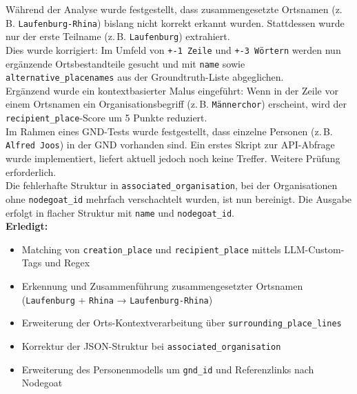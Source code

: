 \documentclass{article}
\begin{document}
\vspace{0.5em}
\noindent Während der Analyse wurde festgestellt, dass zusammengesetzte Ortsnamen (z.\,B. \texttt{Laufenburg-Rhina}) bislang nicht korrekt erkannt wurden. Stattdessen wurde nur der erste Teilname (z.\,B. \texttt{Laufenburg}) extrahiert.\\
Dies wurde korrigiert: Im Umfeld von \texttt{+-1 Zeile} und \texttt{+-3 Wörtern} werden nun ergänzende Ortsbestandteile gesucht und mit \texttt{name} sowie \texttt{alternative\_placenames} aus der Groundtruth-Liste abgeglichen.\\

\noindent{} Ergänzend wurde ein kontextbasierter Malus eingeführt: Wenn in der Zeile vor einem Ortsnamen ein Organisationsbegriff (z.\,B. \texttt{Männerchor}) erscheint, wird der \texttt{recipient\_place}-Score um 5 Punkte reduziert.\\

\noindent{} Im Rahmen eines GND-Tests wurde festgestellt, dass einzelne Personen (z.\,B. \texttt{Alfred Joos}) in der GND vorhanden sind. Ein erstes Skript zur API-Abfrage wurde implementiert, liefert aktuell jedoch noch keine Treffer. Weitere Prüfung erforderlich.\\

\noindent{} Die fehlerhafte Struktur in \texttt{associated\_organisation}, bei der Organisationen ohne \texttt{nodegoat\_id} mehrfach verschachtelt wurden, ist nun bereinigt. Die Ausgabe erfolgt in flacher Struktur mit \texttt{name} und \texttt{nodegoat\_id}.\\


\vspace{0.5em}
\noindent\textbf{Erledigt:}
\begin{itemize}
    \item Matching von \texttt{creation\_place} und \texttt{recipient\_place} mittels LLM-Custom-Tags und Regex
    \item Erkennung und Zusammenführung zusammengesetzter Ortsnamen (\texttt{Laufenburg} + \texttt{Rhina} → \texttt{Laufenburg-Rhina})
    \item Erweiterung der Orts-Kontextverarbeitung über \texttt{surrounding\_place\_lines}
    \item Korrektur der JSON-Struktur bei \texttt{associated\_organisation}
    \item Erweiterung des Personenmodells um \texttt{gnd\_id} und Referenzlinks nach Nodegoat
\end{itemize}
\end{document}
